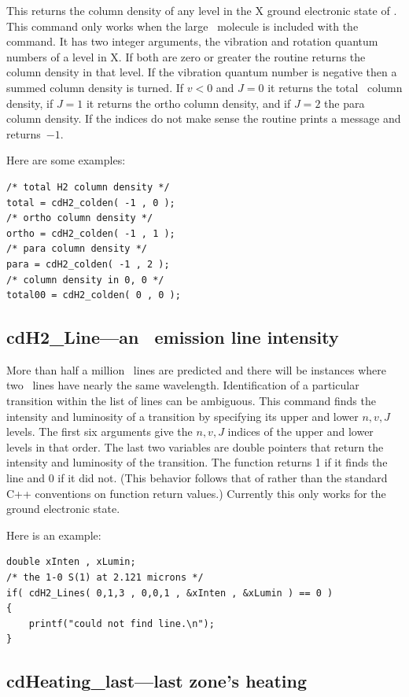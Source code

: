 This returns the column density of any level in the X ground
electronic state of \htwo.
This command only works when the large \htwo\ molecule
is included with the  command.
It has two integer arguments, the
vibration and rotation quantum numbers of a level in X.
If both are zero
or greater the routine returns the column density in that level.
If the
vibration quantum number is negative then a summed column density is turned.
If $v<0$ and $J=0$ it returns the total \htwo\ column density, if $J=1$ it returns
the ortho column density, and if $J=2$ the para column density.
If the indices
do not make sense the routine prints a message and returns~$-1$.

Here are some examples:
\begin{verbatim}
/* total H2 column density */
total = cdH2_colden( -1 , 0 );
/* ortho column density */
ortho = cdH2_colden( -1 , 1 );
/* para column density */
para = cdH2_colden( -1 , 2 );
/* column density in 0, 0 */
total00 = cdH2_colden( 0 , 0 );
\end{verbatim}

\subsection{cdH2\_Line---an \htwo\ emission line intensity}

More than half a million \htwo\ lines are predicted and there will be
instances where two \htwo\ lines have nearly the same wavelength.  Identification
of a particular transition within the list of lines can be ambiguous.  This
command finds the intensity and luminosity of a transition by specifying
its upper and lower $n, v, J$ levels.
The first six arguments give the $n,
v, J$ indices of the upper and lower levels in that order.
The last two
variables are double pointers that return the intensity and luminosity of
the transition.
The function returns 1 if it finds the line and 0 if it
did not.
(This behavior follows that of  rather than the standard
C++ conventions on function return values.)
Currently this only works
for the ground electronic state.

Here is an example:
\begin{verbatim}
double xInten , xLumin;
/* the 1-0 S(1) at 2.121 microns */
if( cdH2_Lines( 0,1,3 , 0,0,1 , &xInten , &xLumin ) == 0 )
{
    printf("could not find line.\n");
}
\end{verbatim}

\subsection{cdHeating\_last---last zone's heating}

